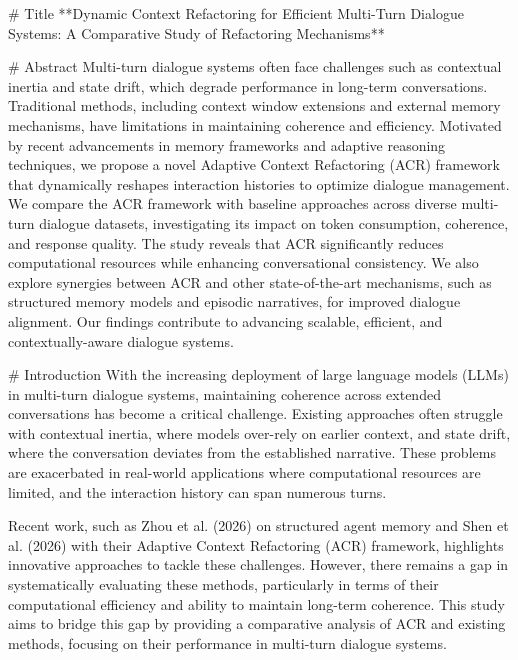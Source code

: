 # Title  
**Dynamic Context Refactoring for Efficient Multi-Turn Dialogue Systems: A Comparative Study of Refactoring Mechanisms**

# Abstract  
Multi-turn dialogue systems often face challenges such as contextual inertia and state drift, which degrade performance in long-term conversations. Traditional methods, including context window extensions and external memory mechanisms, have limitations in maintaining coherence and efficiency. Motivated by recent advancements in memory frameworks and adaptive reasoning techniques, we propose a novel Adaptive Context Refactoring (ACR) framework that dynamically reshapes interaction histories to optimize dialogue management. We compare the ACR framework with baseline approaches across diverse multi-turn dialogue datasets, investigating its impact on token consumption, coherence, and response quality. The study reveals that ACR significantly reduces computational resources while enhancing conversational consistency. We also explore synergies between ACR and other state-of-the-art mechanisms, such as structured memory models and episodic narratives, for improved dialogue alignment. Our findings contribute to advancing scalable, efficient, and contextually-aware dialogue systems.

# Introduction  
With the increasing deployment of large language models (LLMs) in multi-turn dialogue systems, maintaining coherence across extended conversations has become a critical challenge. Existing approaches often struggle with contextual inertia, where models over-rely on earlier context, and state drift, where the conversation deviates from the established narrative. These problems are exacerbated in real-world applications where computational resources are limited, and the interaction history can span numerous turns.

Recent work, such as Zhou et al. (2026) on structured agent memory and Shen et al. (2026) with their Adaptive Context Refactoring (ACR) framework, highlights innovative approaches to tackle these challenges. However, there remains a gap in systematically evaluating these methods, particularly in terms of their computational efficiency and ability to maintain long-term coherence. This study aims to bridge this gap by providing a comparative analysis of ACR and existing methods, focusing on their performance in multi-turn dialogue systems.

